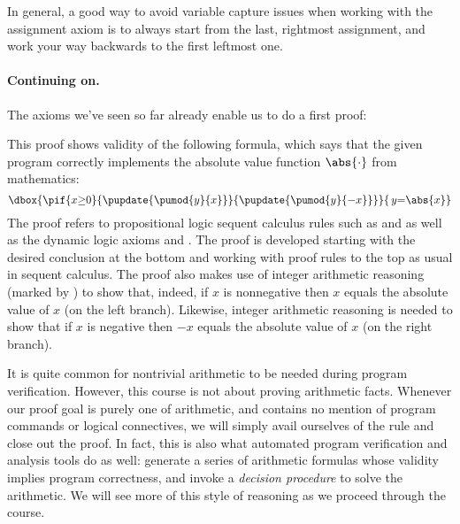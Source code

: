 \documentclass[11pt,twoside]{scrartcl}
\begin{document}
In general, a good way to avoid variable capture issues when working with the assignment axiom is to always start from the last, rightmost assignment, and work your way backwards to the first leftmost one.

\paragraph{Continuing on.} 
The axioms we've seen so far already enable us to do a first proof:
\begin{sequentdeduction}[array]
{\lsequent{} {}}
\end{sequentdeduction}

This proof shows validity of the following formula, which says that the given program correctly implements the absolute value function \(\abs{\cdot}\) from mathematics:
\[{\dbox{\pif{x{\geq}0}{\pupdate{\pumod{y}{x}}}{\pupdate{\pumod{y}{-x}}}}{\,y{=}\abs{x}}}\]
The proof refers to propositional logic sequent calculus rules such as  and  as well as the dynamic logic axioms  and .
The proof is developed starting with the desired conclusion at the bottom and working with proof rules to the top as usual in sequent calculus.
The proof also makes use of integer arithmetic reasoning (marked by ) to show that, indeed, if $x$ is nonnegative then $x$ equals the absolute value of $x$ (on the left branch).
Likewise, integer arithmetic reasoning is needed to show that if $x$ is negative then $-x$ equals the absolute value of $x$ (on the right branch).

It is quite common for nontrivial arithmetic to be needed during program verification. However, this course is not about proving arithmetic facts. Whenever our proof goal is purely one of arithmetic, and contains no mention of program commands or logical connectives, we will simply avail ourselves of the  rule and close out the proof. In fact, this is also what automated program verification and analysis tools do as well: generate a series of arithmetic formulas whose validity implies program correctness, and invoke a \emph{decision procedure} to solve the arithmetic. We will see more of this style of reasoning as we proceed through the course.
\end{document}
